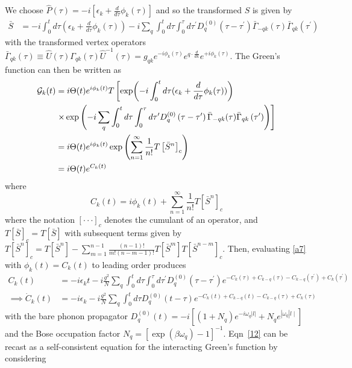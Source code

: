 We choose $\hat{P}(\tau)=-i\left[\epsilon_k+\frac{d}{d \tau} \phi_k(\tau)\right]$ and
so the transformed $S$ is given by
\begin{align}
    \bar{S}
&= -i \int_0^t d \tau\left(\epsilon_k+\frac{d}{d \tau} \phi_k(\tau)\right) -i \sum_q \int_0^t d \tau \int_0^\tau d \tau^{\prime} D_q^{(0)}\left(\tau-\tau^{\prime}\right) \bar{\Gamma}_{-q k}(\tau) \bar{\Gamma}_{q k}\left(\tau^{\prime}\right)
\end{align}
with the transformed vertex operators $\bar{\Gamma}_{q k}(\tau)\equiv  \hat{U}(\tau)\Gamma_{q k}(\tau)\hat{U}^{-1}(\tau)=g_{q k} e^{-i \phi_k(\tau)} e^{q \cdot \frac{d}{d k}} e^{+i \phi_k(\tau)}$. The Green's function can then be written as
\begin{align}
    \mathcal{G}_k(t)&=i\Theta(t) e^{i \phi_k(t)} T \left[\exp (-i \int_0^t d \tau(\epsilon_k+\frac{d}{d \tau} \phi_k(\tau)))\right. \\
& \left.\times \exp \left(-i \sum_q \int_0^t d \tau \int_0^\tau d \tau^{\prime} D_q^{(0)}\left(\tau-\tau^{\prime}\right) \bar{\Gamma}_{-q k}(\tau) \bar{\Gamma}_{q k}\left(\tau^{\prime}\right)\right)\right] \notag \\
&=i\Theta(t) e^{i \phi_k(t)} \exp\left(\sum_{n=1}^{\infty} \frac{1}{n!} T\left[\bar{S}^n\right]_c\right) \\
&=i\Theta(t) e^{C_k(t)}
\end{align}
where
\begin{equation}
    C_k(t)=i\phi_k(t) + \sum_{n=1}^{\infty} \frac{1}{n!} T\left[\bar{S}^n\right]_c
\label{a7}
\end{equation}
where the notation $[\cdot \cdot \cdot]_c$ denotes the cumulant of an operator, and $T[\bar{S}]_c=T[\bar{S}]$ with subsequent terms given by $T\left[\bar{S}^n\right]_c=T\left[\bar{S}^n\right]-\sum_{m=1}^{n-1} \frac{(n-1)!}{m!(n-m-1)!} T\left[\bar{S}^m\right] T\left[\bar{S}^{n-m}\right]_c$. Then, evaluating \ref{a7} with $\phi_k(t)=C_k(t)$ to leading order produces
\begin{align}
    C_k(t)&=-i \epsilon_k t - i \frac{g^2}{N}\sum_q \int_0^t d \tau \int_0^\tau d \tau^{\prime} D_q^{(0)}\left(\tau-\tau^{\prime}\right) e^{-C_k(\tau)+C_{k-q}(\tau)-C_{k-q}\left(\tau^{\prime}\right)+C_k\left(\tau^{\prime}\right)} \label{12} \\
\implies \dot{C}_k(t)&=-i \epsilon_k - i \frac{g^2}{N} \sum_q \int_0^t d \tau D_q^{(0)}(t-\tau) e^{-C_k(t)+C_{k-q}(t)-C_{k-q}(\tau)+C_k(\tau)} \label{13}
\end{align}
with the bare phonon propagator $D_q^{(0)}(t)= -i\left[\left(1+N_q\right) e^{-i \omega_q|l|}+N_q e^{\left|\omega_q\right| l \mid}\right]$ and the Bose occupation factor $N_q=\left[\exp \left(\beta \omega_q\right)-1\right]^{-1}$.  Eqn~\ref{12} can be recast as a self-consistent equation for the interacting Green's function by considering
